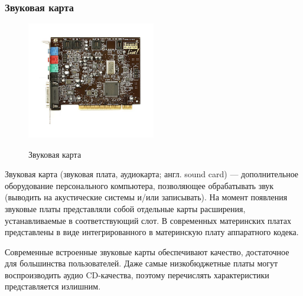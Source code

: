 \subsubsection{Звуковая карта}\label{base:introduction:components:soundcard}
\begin{figure}
 \centering
 \includegraphics[width=0.5\textwidth]{base/Introduction/Soundcard.jpg}
 \label{base:introduction:components:soundcard:soundcardpic}
 \caption{Звуковая карта}
\end{figure}
Звуковая карта (звуковая плата, аудиокарта; англ. sound card) — дополнительное оборудование персонального компьютера, позволяющее обрабатывать звук (выводить на акустические системы и/или записывать).
На момент появления звуковые платы представляли собой отдельные карты расширения, устанавливаемые в соответствующий слот.
В современных материнских платах представлены в виде интегрированного в материнскую плату аппаратного кодека.

Современные встроенные звуковые карты обеспечивают качество, достаточное для большинства пользователей.  Даже самые низкобюджетные платы могут воспроизводить аудио CD-качества, поэтому перечислять характеристики представляется излишним.

